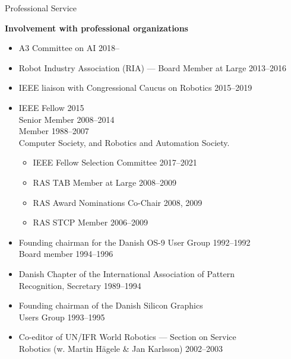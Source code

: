 \documentclass{article}
\begin{document}
\begin{cv}
\begin{cvlist}{Professional Service}
\item {\bf Involvement with professional organizations}
  \begin{itemize}
  \item A3 Committee on AI \cftdotfill{\cftdotsep} 2018--
  \item Robot Industry Association (RIA) --- Board Member at Large
    \cftdotfill{\cftdotsep} 2013--2016
  \item IEEE liaison with Congressional Caucus on Robotics
    \cftdotfill{\cftdotsep}  2015--2019
  \item IEEE Fellow \cftdotfill{\cftdotsep} 2015\\
    Senior Member \cftdotfill{\cftdotsep} 2008--2014\\
    Member \cftdotfill{\cftdotsep} 1988--2007\\
    Computer Society, and Robotics and Automation Society.
    \begin{itemize}
    \item IEEE Fellow Selection Committee \cftdotfill{\cftdotsep} 2017--2021
    \item RAS TAB Member at Large \cftdotfill{\cftdotsep} 2008--2009
    \item RAS Award Nominations Co-Chair \cftdotfill{\cftdotsep} 2008, 2009
    \item RAS STCP Member \cftdotfill{\cftdotsep} 2006--2009
    \end{itemize}
  \item Founding chairman for the Danish OS-9 User Group
    \cftdotfill{\cftdotsep} 1992--1992\\ Board member
    \cftdotfill{\cftdotsep} 1994--1996
  \item Danish Chapter of the International Association of
    Pattern\\ Recognition, Secretary \cftdotfill{\cftdotsep}
    1989--1994
  \item Founding chairman of the Danish Silicon Graphics \\Users Group
    \cftdotfill{\cftdotsep} 1993--1995
  \item Co-editor of UN/IFR World Robotics --- Section on
    Service\\ Robotics (w. Martin H\"agele \& Jan Karlsson)
    \cftdotfill{\cftdotsep} 2002--2003
  \end{itemize}


\end{cvlist}
\end{cv}
\end{document}
